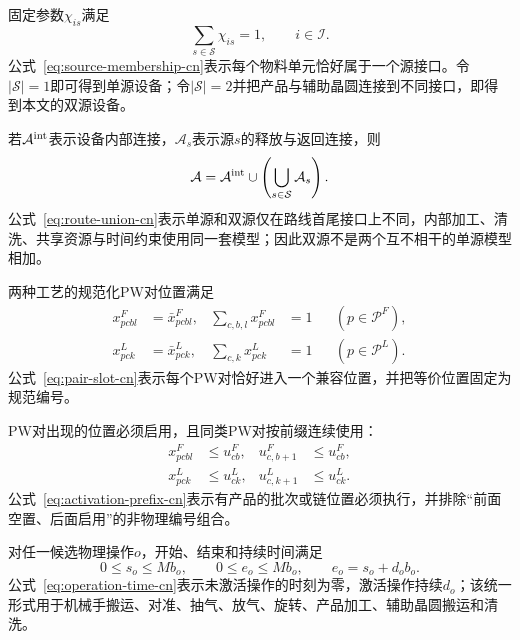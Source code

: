 \documentclass[final,5p,times,twocolumn]{elsarticle}
\begin{document}
固定参数$\chi_{is}$满足
\begin{equation}
\sum_{s\in\mathcal S}\chi_{is}=1,
\qquad i\in\mathcal I.
\label{eq:source-membership-cn}
\end{equation}
公式~\eqref{eq:source-membership-cn}表示每个物料单元恰好属于一个源接口。令$|\mathcal S|=1$即可得到单源设备；令$|\mathcal S|=2$并把产品与辅助晶圆连接到不同接口，即得到本文的双源设备。

若$\mathcal A^{\rm int}$表示设备内部连接，$\mathcal A_s$表示源$s$的释放与返回连接，则
\begin{equation}
\mathcal A=\mathcal A^{\rm int}\cup
\left(\bigcup_{s\in\mathcal S}\mathcal A_s\right).
\label{eq:route-union-cn}
\end{equation}
公式~\eqref{eq:route-union-cn}表示单源和双源仅在路线首尾接口上不同，内部加工、清洗、共享资源与时间约束使用同一套模型；因此双源不是两个互不相干的单源模型相加。

两种工艺的规范化PW对位置满足
\begin{equation}
\begin{aligned}
x^F_{pcbl}&=\bar x^F_{pcbl}, &
\sum_{c,b,l}x^F_{pcbl}&=1 &&(p\in\mathcal P^F),\\
x^L_{pck}&=\bar x^L_{pck}, &
\sum_{c,k}x^L_{pck}&=1 &&(p\in\mathcal P^L).
\end{aligned}
\label{eq:pair-slot-cn}
\end{equation}
公式~\eqref{eq:pair-slot-cn}表示每个PW对恰好进入一个兼容位置，并把等价位置固定为规范编号。

PW对出现的位置必须启用，且同类PW对按前缀连续使用：
\begin{equation}
\begin{aligned}
x^F_{pcbl}&\le u^F_{cb}, &u^F_{c,b+1}&\le u^F_{cb},\\
x^L_{pck}&\le u^L_{ck}, &u^L_{c,k+1}&\le u^L_{ck}.
\end{aligned}
\label{eq:activation-prefix-cn}
\end{equation}
公式~\eqref{eq:activation-prefix-cn}表示有产品的批次或链位置必须执行，并排除“前面空置、后面启用”的非物理编号组合。

对任一候选物理操作$o$，开始、结束和持续时间满足
\begin{equation}
0\le s_o\le Mb_o,\qquad
0\le e_o\le Mb_o,\qquad
e_o=s_o+d_ob_o.
\label{eq:operation-time-cn}
\end{equation}
公式~\eqref{eq:operation-time-cn}表示未激活操作的时刻为零，激活操作持续$d_o$；该统一形式用于机械手搬运、对准、抽气、放气、旋转、产品加工、辅助晶圆搬运和清洗。
\end{document}
